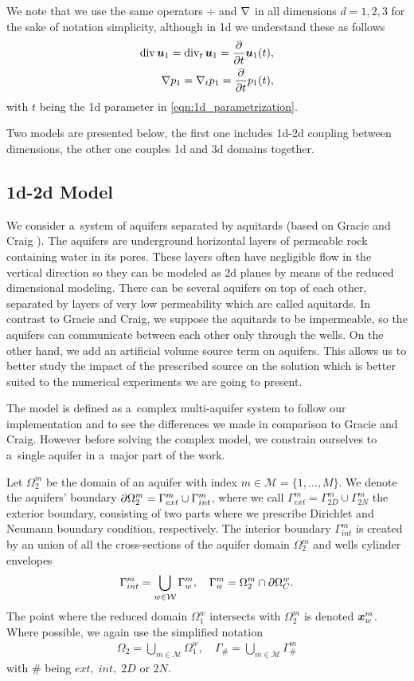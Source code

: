 We note that we use the same operators $\div$ and $\nabla$ in all dimensions $d=1,2,3$ for the sake of notation simplicity,
although in 1d we understand these as follows
\begin{eqnarray*}
{\rm div}\,\mathbf{\boldsymbol{u}}_1 = {\rm div}_t\,\mathbf{\boldsymbol{u}}_1 = \frac{\partial}{\partial t} \mathbf{\boldsymbol{u}}_1(t), \\
\nabla p_1 = \nabla_t p_1 = \frac{\partial}{\partial t} p_1(t), \\
\end{eqnarray*}
with $t$ being the 1d parameter in \eqref{eqn:1d_parametrization}.

Two models are presented below, the first one includes 1d-2d coupling between dimensions,
the other one couples 1d and 3d domains together.


\subsection{1d-2d Model}
We consider a~system of aquifers separated by aquitards
(based on Gracie and Craig \cite{gracie_modelling_2010,craig_using_2011}).
The aquifers are underground horizontal layers of permeable rock containing water in its pores.
These layers often have negligible flow in the vertical direction so they can be modeled
as 2d planes by means of the reduced dimensional modeling.
There can be several aquifers on top of each other, separated by layers of very low permeability
which are called aquitards.
In contrast to Gracie and Craig, we suppose the aquitards to be impermeable, 
so the aquifers can communicate between each other only through the wells.
On the other hand, we add an artificial volume source term on aquifers.
This allows us to better study the impact of the prescribed source on the solution
which is better suited to the numerical experiments we are going to present. 

The model is defined as a~complex multi-aquifer system to follow our implementation and to see the differences
we made in comparison to Gracie and Craig. However before solving the complex model,
we constrain ourselves to a~single aquifer in a~major part of the work.

Let $\Omega^m_2$ be the domain of an aquifer with index $m\in\mathcal{M}=\{1,\ldots,M\}$.
We denote the aquifers' boundary $\partial\Omega^m_2 = \Gamma^m_{ext} \cup \Gamma^m_{int}$,
where we call $\Gamma^m_{ext} = \Gamma^m_{2D} \cup \Gamma^m_{2N}$ the exterior boundary, consisting of two parts where we prescribe
Dirichlet and Neumann boundary condition, respectively.
The interior boundary $\Gamma^m_{int}$ is created by an union of all the cross-sections of the aquifer domain $\Omega^m_2$
and wells cylinder envelopes
\[
    \Gamma^m_{int} = \bigcup_{\substack{w\in\mathcal{W}}} \Gamma^m_w, \quad \Gamma^m_w = \Omega^m_2 \cap \partial\Omega^w_C.
\]
The point where the reduced domain $\Omega^w_1$ intersects with $\Omega^m_2$ is denoted $\mathbf{\boldsymbol{x}}^m_w$.
Where possible, we again use the simplified notation
\begin{eqnarray*}
    \Omega_2 = \bigcup_{m\in\mathcal{M}} \Omega^w_1, \quad \Gamma_{\#} = \bigcup_{m\in\mathcal{M}} \Gamma^m_{\#}
\end{eqnarray*}
with $\#$ being $ext,\; int,\; 2D$ or $2N$.


